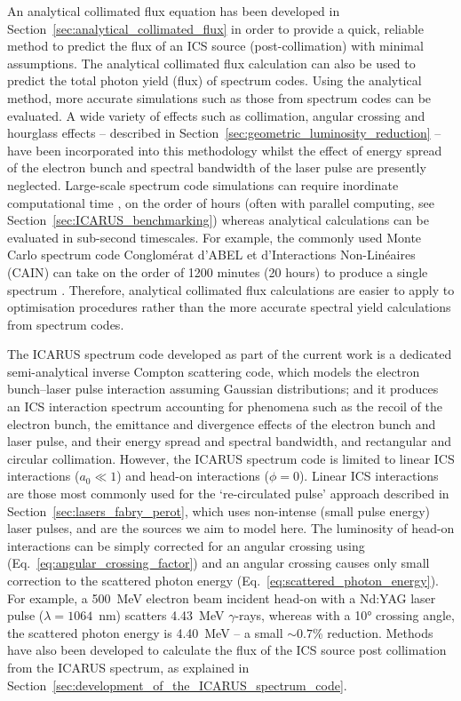 \documentclass[../main.tex]{subfiles}
\begin{document}
An analytical collimated flux equation has been developed in Section~\ref{sec:analytical_collimated_flux} in order to provide a quick, reliable method to predict the flux of an ICS source (post-collimation) with minimal assumptions. The analytical collimated flux calculation can also be used to predict the total photon yield (flux) of spectrum codes. Using the analytical method, more accurate simulations such as those from spectrum codes can be evaluated. A wide variety of effects such as collimation, angular crossing and hourglass effects -- described in Section~\ref{sec:geometric_luminosity_reduction} -- have been incorporated into this methodology whilst the effect of energy spread of the electron bunch and spectral bandwidth of the laser pulse are presently neglected. Large-scale spectrum code simulations can require inordinate computational time \cite{ranjan2018simulation}, on the order of hours (often with parallel computing, see Section~\ref{sec:ICARUS_benchmarking}) whereas analytical calculations can be evaluated in sub-second timescales. For example, the commonly used Monte Carlo spectrum code Conglom\'{e}rat d'ABEL et d'Interactions Non-Lin\'{e}aires (\textsc{CAIN}) \cite{chen1995cain} can take on the order of 1200 minutes (20 hours) to produce a single spectrum \cite{sun2011theoretical}. Therefore, analytical collimated flux calculations are easier to apply to optimisation procedures rather than the more accurate spectral yield calculations from spectrum codes.

The \textsc{ICARUS} spectrum code developed as part of the current work is a dedicated semi-analytical inverse Compton scattering code, which models the electron bunch--laser pulse interaction assuming Gaussian distributions; and it produces an ICS interaction spectrum
accounting for phenomena such as the recoil of the electron bunch, the emittance and divergence effects of the electron bunch and laser pulse, and their energy spread and spectral bandwidth, and rectangular and circular collimation. However, the \textsc{ICARUS} spectrum code is limited to linear ICS interactions ($a_{0} \ll 1$) and head-on interactions ($\phi=0$). Linear ICS interactions are those most commonly used for the `re-circulated pulse' approach described in Section~\ref{sec:lasers_fabry_perot}, which uses non-intense (small pulse energy) laser pulses, and are the sources we aim to model here. The luminosity of head-on interactions can be simply corrected for an angular crossing using (Eq.~\ref{eq:angular_crossing_factor}) and an angular crossing causes only small correction to the scattered photon energy (Eq.~\ref{eq:scattered_photon_energy}). For example, a  500~\si{\mega\electronvolt} electron beam incident head-on with a Nd:YAG laser pulse ($\lambda = 1064$~\si{\nano\meter}) scatters 4.43~\si{\mega\electronvolt} $\gamma$-rays, whereas with a 10\si{\degree} crossing angle, the scattered photon energy is 4.40~\si{\mega\electronvolt} -- a small $\sim0.7$\% reduction. Methods have also been developed to calculate the flux of the ICS source post collimation from the \textsc{ICARUS} spectrum, as explained in Section~\ref{sec:development_of_the_ICARUS_spectrum_code}. 
\end{document}
